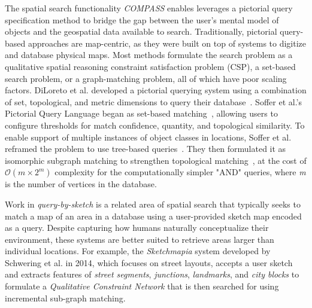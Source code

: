 \par{The spatial search functionality \emph{COMPASS} enables leverages a pictorial query specification method to bridge the gap between the user's mental model of objects and the geospatial data available to search. 
Traditionally, pictorial query-based approaches are map-centric, as they were built on top of systems to digitize and database physical maps\cite{Samet1996,Samet1998}.
Most methods formulate the search problem as a qualitative spatial reasoning constraint satisfaction problem (CSP), a set-based search problem, or a graph-matching problem, all of which have poor scaling factors.
DiLoreto et al. developed a pictorial querying system using a combination of set, topological, and metric dimensions to query their database~\cite{DiLoreto1996}.
Soffer et al.'s Pictorial Query Language began as set-based matching~\cite{Soffer1997, Soffer1998a}, allowing users to configure thresholds for match confidence, quantity, and topological similarity.
To enable support of multiple instances of object classes in locations, Soffer et al. reframed the problem to use tree-based queries~\cite{Soffer1999}.
They then formulated it as isomorphic subgraph matching to strengthen topological matching~\cite{Folkers2000}, at the cost of $\mathcal{O}(m\times 2^m)$ complexity for the computationally simpler "AND" queries, where \textit{m} is the number of vertices in the database. 

Work in \textit{query-by-sketch} is a related area of spatial search that typically seeks to match a map of an area in a database using a user-provided sketch map encoded as a query. 
Despite capturing how humans naturally conceptualize their environment, these systems are better suited to retrieve areas larger than individual locations.
For example, the \textit{Sketchmapia} system developed by Schwering et al. in 2014, which focuses on street layouts, accepts a user sketch and extracts features of \textit{street segments}, \textit{junctions}, \textit{landmarks}, and \textit{city blocks} to formulate a \textit{Qualitative Constraint Network} that is then searched for using incremental sub-graph matching.
}



